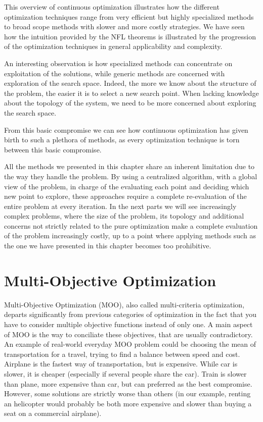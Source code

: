 This overview of continuous optimization illustrates how the different optimization techniques range from very efficient but highly specialized methods to broad scope methods with slower and more costly strategies.
We have seen how the intuition provided by the NFL theorems is illustrated by the progression of the optimization techniques in general applicability and complexity.

An interesting observation is how specialized methods can concentrate on exploitation of the solutions, while generic methods are concerned with exploration of the search space. Indeed, the more we know about the structure of the problem, the easier it is to select a new search point. When lacking knowledge about the topology of the system, we need to be more concerned about exploring the search space.

From this basic compromise we can see how continuous optimization has given birth to such a plethora of methods, as every optimization technique is torn between this basic compromise.

All the methods we presented in this chapter share an inherent limitation due to the way they handle the problem. By using a centralized algorithm, with a global view of the problem, in charge of the evaluating each point and deciding which new point to explore, these approaches require a complete re-evaluation of the entire problem at every iteration. In the next parts we will see increasingly complex problems, where the size of the problem, its topology and additional concerns not strictly related to the pure optimization make a complete evaluation of the problem increasingly costly, up to a point where applying methods such as the one we have presented in this chapter becomes too prohibitive.

\chapter{Multi-Objective Optimization}

Multi-Objective Optimization (MOO), also called multi-criteria optimization, departs significantly from previous categories of optimization in the fact that you have to consider multiple objective functions instead of only one. A main aspect of MOO is the way to conciliate these objectives, that are usually contradictory.
An example of real-world everyday MOO problem could be choosing the mean of transportation for a travel, trying to find a balance between speed and cost. Airplane is the fastest way of transportation, but is expensive. While car is slower, it is cheaper (especially if several people share the car). Train is slower than plane, more expensive than car, but can preferred as the best compromise. However, some solutions are strictly worse than others (in our example, renting an helicopter would probably be both more expensive and slower than buying a seat on a commercial airplane).

